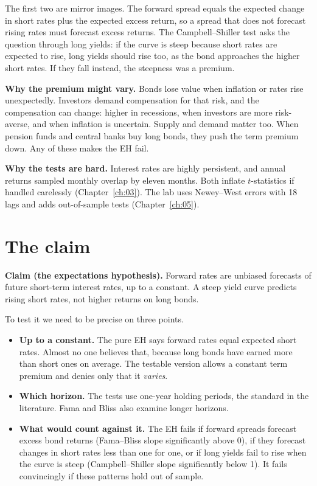 The first two are mirror images. The forward spread equals the expected change in short rates plus the expected excess return, so a spread that does not forecast rising rates must forecast excess returns. The Campbell--Shiller test asks the question through long yields: if the curve is steep because short rates are expected to rise, long yields should rise too, as the bond approaches the higher short rates. If they fall instead, the steepness was a premium.

\textbf{Why the premium might vary.} Bonds lose value when inflation or rates rise unexpectedly. Investors demand compensation for that risk, and the compensation can change: higher in recessions, when investors are more risk-averse, and when inflation is uncertain. Supply and demand matter too. When pension funds and central banks buy long bonds, they push the term premium down. Any of these makes the EH fail.

\textbf{Why the tests are hard.} Interest rates are highly persistent, and annual returns sampled monthly overlap by eleven months. Both inflate $t$-statistics if handled carelessly (Chapter~\ref{ch:03}). The lab uses Newey--West errors with 18 lags and adds out-of-sample tests (Chapter~\ref{ch:05}).

\section{The claim}
\label{sec:16-claim}

\begin{callout}
\textbf{Claim (the expectations hypothesis).} Forward rates are unbiased forecasts of future short-term interest rates, up to a constant. A steep yield curve predicts rising short rates, not higher returns on long bonds.
\end{callout}

To test it we need to be precise on three points.

\begin{itemize}
  \item \textbf{Up to a constant.} The pure EH says forward rates equal expected short rates. Almost no one believes that, because long bonds have earned more than short ones on average. The testable version allows a constant term premium and denies only that it \emph{varies}.
  \item \textbf{Which horizon.} The tests use one-year holding periods, the standard in the literature. Fama and Bliss also examine longer horizons.
  \item \textbf{What would count against it.} The EH fails if forward spreads forecast excess bond returns (Fama--Bliss slope significantly above 0), if they forecast changes in short rates less than one for one, or if long yields fail to rise when the curve is steep (Campbell--Shiller slope significantly below 1). It fails convincingly if these patterns hold out of sample.
\end{itemize}

